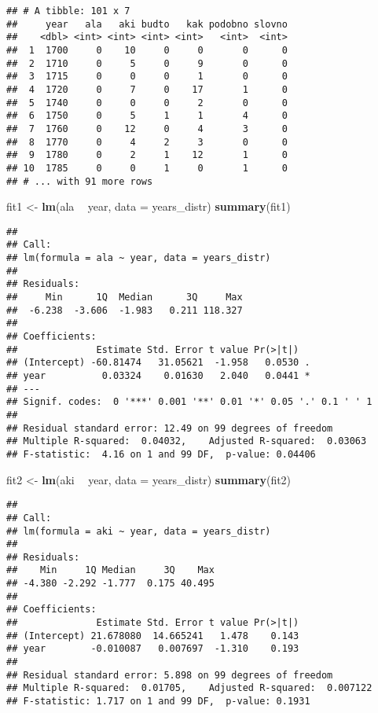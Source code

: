 \documentclass[
]{article}
\newenvironment{Shaded}{\begin{snugshade}}{\end{snugshade}}
\newcommand{\DataTypeTok}[1]{\textcolor[rgb]{0.13,0.29,0.53}{#1}}
\newcommand{\KeywordTok}[1]{\textcolor[rgb]{0.13,0.29,0.53}{\textbf{#1}}}
\newcommand{\NormalTok}[1]{#1}
\newcommand{\OperatorTok}[1]{\textcolor[rgb]{0.81,0.36,0.00}{\textbf{#1}}}
\newcommand{\StringTok}[1]{\textcolor[rgb]{0.31,0.60,0.02}{#1}}
\begin{document}
\begin{verbatim}
## # A tibble: 101 x 7
##     year   ala   aki budto   kak podobno slovno
##    <dbl> <int> <int> <int> <int>   <int>  <int>
##  1  1700     0    10     0     0       0      0
##  2  1710     0     5     0     9       0      0
##  3  1715     0     0     0     1       0      0
##  4  1720     0     7     0    17       1      0
##  5  1740     0     0     0     2       0      0
##  6  1750     0     5     1     1       4      0
##  7  1760     0    12     0     4       3      0
##  8  1770     0     4     2     3       0      0
##  9  1780     0     2     1    12       1      0
## 10  1785     0     0     1     0       1      0
## # ... with 91 more rows
\end{verbatim}

\begin{Shaded}
\begin{Highlighting}[]
\NormalTok{fit1 <-}\StringTok{ }\KeywordTok{lm}\NormalTok{(ala }\OperatorTok{~}\StringTok{ }\NormalTok{year, }\DataTypeTok{data =}\NormalTok{ years_distr)}
\KeywordTok{summary}\NormalTok{(fit1)}
\end{Highlighting}
\end{Shaded}

\begin{verbatim}
## 
## Call:
## lm(formula = ala ~ year, data = years_distr)
## 
## Residuals:
##     Min      1Q  Median      3Q     Max 
##  -6.238  -3.606  -1.983   0.211 118.327 
## 
## Coefficients:
##              Estimate Std. Error t value Pr(>|t|)  
## (Intercept) -60.81474   31.05621  -1.958   0.0530 .
## year          0.03324    0.01630   2.040   0.0441 *
## ---
## Signif. codes:  0 '***' 0.001 '**' 0.01 '*' 0.05 '.' 0.1 ' ' 1
## 
## Residual standard error: 12.49 on 99 degrees of freedom
## Multiple R-squared:  0.04032,    Adjusted R-squared:  0.03063 
## F-statistic:  4.16 on 1 and 99 DF,  p-value: 0.04406
\end{verbatim}

\begin{Shaded}
\begin{Highlighting}[]
\NormalTok{fit2 <-}\StringTok{ }\KeywordTok{lm}\NormalTok{(aki }\OperatorTok{~}\StringTok{ }\NormalTok{year, }\DataTypeTok{data =}\NormalTok{ years_distr)}
\KeywordTok{summary}\NormalTok{(fit2)}
\end{Highlighting}
\end{Shaded}

\begin{verbatim}
## 
## Call:
## lm(formula = aki ~ year, data = years_distr)
## 
## Residuals:
##    Min     1Q Median     3Q    Max 
## -4.380 -2.292 -1.777  0.175 40.495 
## 
## Coefficients:
##              Estimate Std. Error t value Pr(>|t|)
## (Intercept) 21.678080  14.665241   1.478    0.143
## year        -0.010087   0.007697  -1.310    0.193
## 
## Residual standard error: 5.898 on 99 degrees of freedom
## Multiple R-squared:  0.01705,    Adjusted R-squared:  0.007122 
## F-statistic: 1.717 on 1 and 99 DF,  p-value: 0.1931
\end{verbatim}
\end{document}
